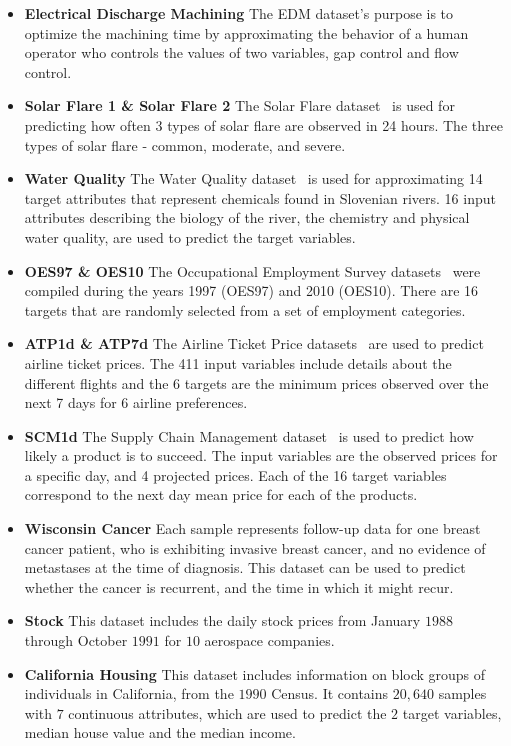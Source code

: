 \documentclass[preprint,12pt]{elsarticle}
\begin{document}
\begin{itemize}
\item \textbf{Electrical Discharge Machining} The EDM dataset's purpose is to optimize the machining time by approximating the behavior of a human operator who controls the values of two variables, gap control and flow control. 
\item \textbf{Solar Flare 1 \& Solar Flare 2} The Solar Flare dataset~\cite{mulan} is used for predicting how often 3 types of solar flare are observed in 24 hours. The three types of solar flare - common, moderate, and severe. 
\item \textbf{Water Quality} The Water Quality dataset~\cite{mulan} is used for approximating 14 target attributes that represent chemicals found in Slovenian rivers. 16 input attributes describing the biology of the river, the chemistry and physical water quality, are used to predict the target variables.
\item \textbf{OES97 \& OES10} The Occupational Employment Survey datasets~\cite{mulan} were compiled during the years 1997 (OES97) and 2010 (OES10). There are 16 targets that are randomly selected from a set of employment categories.
\item \textbf{ATP1d \& ATP7d} The Airline Ticket Price datasets~\cite{mulan} are used to predict airline ticket prices. The 411 input variables include details about the different flights and the 6 targets are the minimum prices observed over the next 7 days for 6 airline preferences. 
\item \textbf{SCM1d} The Supply Chain Management dataset~\cite{mulan} is used to predict how likely a product is to succeed. The input variables are the observed prices for a specific day, and 4 projected prices. Each of the 16 target variables correspond to the next day mean price for each of the products. 
\item \textbf{Wisconsin Cancer} Each sample represents follow-up data for one breast cancer patient, who is exhibiting invasive breast cancer, and no evidence of metastases at the time of diagnosis. This dataset can be used to predict whether the cancer is recurrent, and the time in which it might recur. 
\item \textbf{Stock} This dataset includes the daily stock prices from January $1988$ through October $1991$ for $10$ aerospace companies.
\item \textbf{California Housing} This dataset includes information on block groups of individuals in California, from the $1990$ Census. It contains $20,640$ samples with $7$ continuous attributes, which are used to predict the $2$ target variables, median house value and the median income.

\end{itemize}
\end{document}
